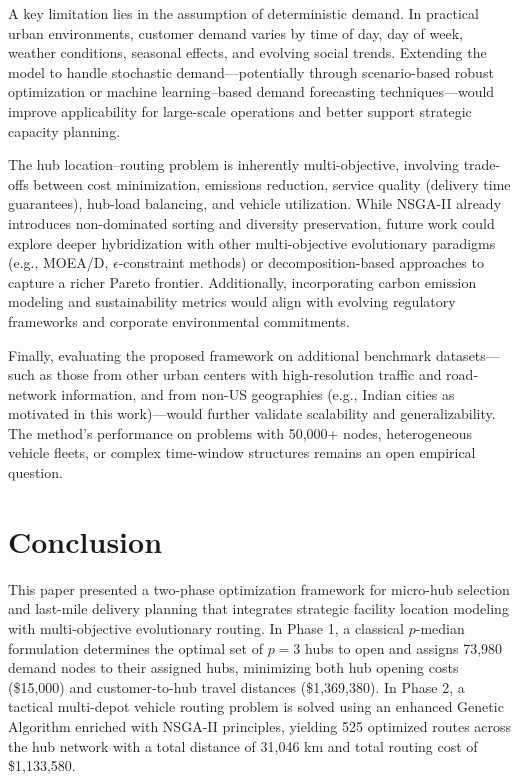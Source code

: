 \documentclass[conference]{IEEEtran}
\begin{document}
A key limitation lies in the assumption of deterministic demand. In practical urban environments, customer demand varies by time of day, day of week, weather conditions, seasonal effects, and evolving social trends. Extending the model to handle stochastic demand—potentially through scenario-based robust optimization or machine learning–based demand forecasting techniques—would improve applicability for large-scale operations and better support strategic capacity planning.

The hub location–routing problem is inherently multi-objective, involving trade-offs between cost minimization, emissions reduction, service quality (delivery time guarantees), hub-load balancing, and vehicle utilization. While NSGA-II already introduces non-dominated sorting and diversity preservation, future work could explore deeper hybridization with other multi-objective evolutionary paradigms (e.g., MOEA/D, $\epsilon$-constraint methods) or decomposition-based approaches to capture a richer Pareto frontier. Additionally, incorporating carbon emission modeling and sustainability metrics would align with evolving regulatory frameworks and corporate environmental commitments.

Finally, evaluating the proposed framework on additional benchmark datasets—such as those from other urban centers with high-resolution traffic and road-network information, and from non-US geographies (e.g., Indian cities as motivated in this work)—would further validate scalability and generalizability. The method's performance on problems with 50,000+ nodes, heterogeneous vehicle fleets, or complex time-window structures remains an open empirical question.

\section{Conclusion}

This paper presented a two-phase optimization framework for micro-hub selection and last-mile delivery planning that integrates strategic facility location modeling with multi-objective evolutionary routing. In Phase 1, a classical $p$-median formulation determines the optimal set of $p=3$ hubs to open and assigns 73,980 demand nodes to their assigned hubs, minimizing both hub opening costs (\$15,000) and customer-to-hub travel distances (\$1,369,380). In Phase 2, a tactical multi-depot vehicle routing problem is solved using an enhanced Genetic Algorithm enriched with NSGA-II principles, yielding 525 optimized routes across the hub network with a total distance of 31,046 km and total routing cost of \$1,133,580.
\end{document}

